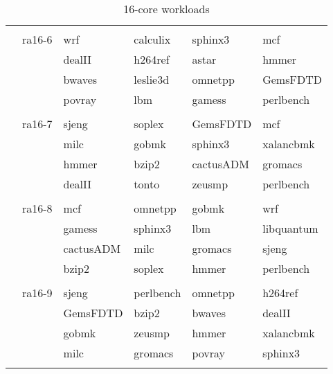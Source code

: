 \begin{table}[ht]
{\begin{tabular}{|r|r|llll|}
 & & & & &  \\ 
			 & ra16-6	 & wrf & calculix & sphinx3 & mcf \\ 
 & 	 & dealII & h264ref & astar & hmmer \\ 
 & 	 & bwaves & leslie3d & omnetpp & GemsFDTD \\ 
 & 	 & povray & lbm & gamess & perlbench \\ 
 & & & & &  \\ 
			 & ra16-7	 & sjeng & soplex & GemsFDTD & mcf \\ 
 & 	 & milc & gobmk & sphinx3 & xalancbmk \\ 
 & 	 & hmmer & bzip2 & cactusADM & gromacs \\ 
 & 	 & dealII & tonto & zeusmp & perlbench \\ 
 & & & & &  \\ 
			 & ra16-8	 & mcf & omnetpp & gobmk & wrf \\ 
 & 	 & gamess & sphinx3 & lbm & libquantum \\ 
 & 	 & cactusADM & milc & gromacs & sjeng \\ 
 & 	 & bzip2 & soplex & hmmer & perlbench \\ 
 & & & & &  \\ 
			 & ra16-9	 & sjeng & perlbench & omnetpp & h264ref \\ 
 & 	 & GemsFDTD & bzip2 & bwaves & dealII \\ 
 & 	 & gobmk & zeusmp & hmmer & xalancbmk \\ 
 & 	 & milc & gromacs & povray & sphinx3 \\ 
 & & & & &  \\ 
\hline
\end{tabular}%
} 
\caption{16-core workloads}
\label{tbl:benchmark_workloads:16-workloads}
\end{table}
